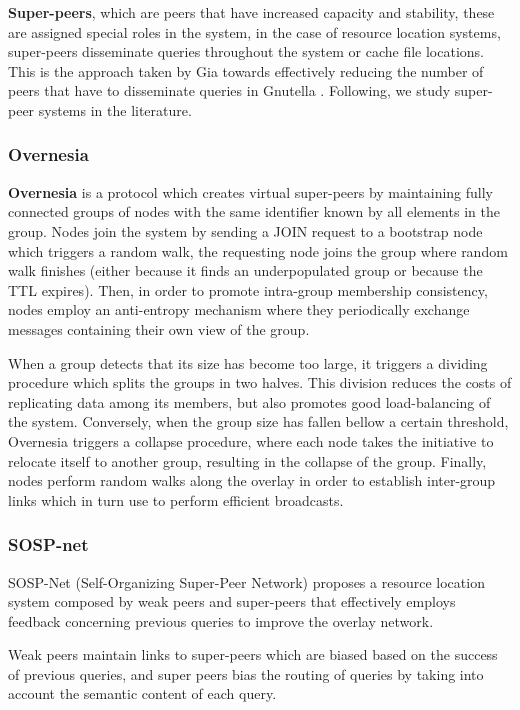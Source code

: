 \textbf{Super-peers}, which are peers that have increased capacity and stability, these are assigned special roles in the system, in the case of resource location systems, super-peers disseminate queries throughout the system or cache file locations. This is the approach taken by Gia \cite{Chawathe2003} towards effectively reducing the number of peers that have to disseminate queries in Gnutella \cite{gnutella_gtk}. Following, we study super-peer systems in the literature.

\subsubsection*{Overnesia}

\textbf{Overnesia} \cite{leitao2014overnesia} is a protocol which creates virtual super-peers by maintaining fully connected groups of nodes with the same identifier known by all elements in the group. Nodes join the system by sending a JOIN request to a bootstrap node which triggers a random walk, the requesting node joins the group where random walk finishes (either because it finds an underpopulated group or because the TTL expires). Then, in order to promote intra-group membership consistency, nodes employ an anti-entropy mechanism where they periodically exchange messages containing their own view of the group. 

When a group detects that its size has become too large, it triggers a dividing procedure which splits the groups in two halves. This division reduces the costs of replicating data among its members, but also promotes good load-balancing of the system. Conversely, when the group size has fallen bellow a certain threshold, Overnesia triggers a collapse procedure, where each node takes the initiative to relocate itself to another group, resulting in the collapse of the group. Finally, nodes perform random walks along the overlay in order to establish inter-group links which in turn use to perform efficient broadcasts.

\subsubsection*{SOSP-net}

SOSP-Net \cite{garbacki2007optimizing}  (Self-Organizing Super-Peer Network) proposes a resource location system composed by weak peers and super-peers that effectively employs feedback concerning previous queries to improve the overlay network. 

Weak peers maintain links to super-peers which are biased based on the success of previous queries, and super peers bias the routing of queries by taking into account the semantic content of each query. 

